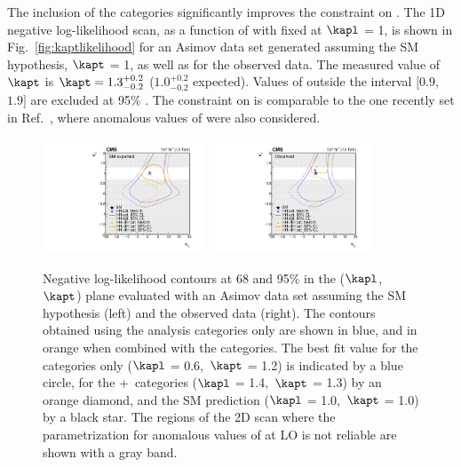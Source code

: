 \documentclass[11pt,a4paper,cmspaper,final,collab]{cms-tdr}
\begin{document}
The inclusion of the \ttH categories significantly improves the constraint on \kapt. The 1D negative log-likelihood scan, as a function of \kapt with \kapl fixed at $\kapl$ = 1, is shown in Fig.~\ref{fig:kaptlikelihood} for an Asimov data set generated assuming the SM hypothesis, $\kapt$ = 1, as well as for the observed data. The measured value of $\kapt$ is $\kapt = 1.3^{+0.2}_{-0.2}$ ($1.0^{+0.2}_{-0.2}$ expected).
Values of \kapt outside the interval $[0.9$, $1.9]$ are excluded at 95\% \CL. The constraint on \kapt is comparable to the one recently set in Ref.~\cite{Sirunyan:2020icl}, where anomalous values of \conev were also considered. 

\begin{figure}[!htb]
  \centering
\includegraphics[width=0.43\textwidth]{Figure_012-a.pdf} 
\includegraphics[width=0.43\textwidth]{Figure_012-b.pdf} 
  \caption{Negative log-likelihood contours at 68 and 95\% \CL in the ($\kapl$,~$\kapt$) plane evaluated with an Asimov data set assuming the SM hypothesis (left) and the observed data (right). The contours obtained using the \HH analysis categories only are shown in blue, and in orange when combined with the \ttH categories. The best fit value for the \HH categories only ($\kapl$ = 0.6,~$\kapt$ = 1.2) is indicated by a blue circle, for the \HH+~\ttH categories ($\kapl$ = 1.4,~$\kapt$ = 1.3) by an orange diamond, and the SM prediction ($\kapl$ = 1.0,~$\kapt$ = 1.0) by a black star. The regions of the 2D scan where the \kapt parametrization for anomalous values of \kapl at LO is not reliable are shown with a gray band.}
  \label{fig:klkaptlikelihood_tthcombination}
\end{figure}
\end{document}
